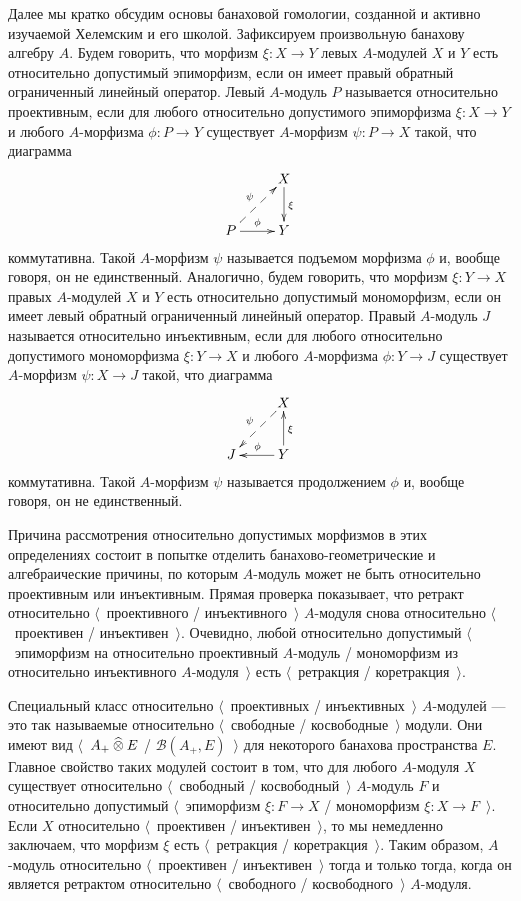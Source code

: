 Далее мы кратко обсудим основы банаховой гомологии, созданной и активно изучаемой Хелемским и его школой. Зафиксируем произвольную банахову алгебру $A$. Будем говорить, что морфизм $\xi:X\to Y$ левых $A$-модулей $X$ и $Y$ есть относительно допустимый эпиморфизм, если он имеет правый обратный ограниченный линейный оператор. Левый $A$-модуль $P$ называется относительно проективным, если для любого относительно допустимого эпиморфизма $\xi:X\to Y$ и любого $A$-морфизма $\phi:P\to Y$ существует $A$-морфизм $\psi:P\to X$ такой, что диаграмма
$$
\xymatrix{
& {X} \ar[d]^{\xi}\\
{P} \ar@{-->}[ur]^{\psi} \ar[r]^{\phi} &{Y}}
$$
коммутативна. Такой $A$-морфизм $\psi$ называется подъемом морфизма $\phi$ и, вообще говоря, он не единственный. Аналогично, будем говорить, что морфизм $\xi:Y\to X$ правых $A$-модулей $X$ и $Y$ есть относительно допустимый мономорфизм, если он имеет левый обратный ограниченный линейный оператор. Правый $A$-модуль $J$ называется относительно инъективным, если для любого относительно допустимого мономорфизма $\xi:Y\to X$ и любого $A$-морфизма $\phi:Y\to J$ существует $A$-морфизм $\psi:X\to J$ такой, что диаграмма
$$
\xymatrix{
& {X} \ar@{-->}[dl]_{\psi} \\
{J} &{Y} \ar[l]_{\phi} \ar[u]_{\xi}}
$$
коммутативна. Такой $A$-морфизм $\psi$ называется продолжением $\phi$ и, вообще говоря, он не единственный.

Причина рассмотрения относительно допустимых морфизмов в этих определениях состоит в попытке отделить банахово-геометрические и алгебраические причины, по которым $A$-модуль может не быть относительно проективным или инъективным. Прямая проверка показывает, что ретракт относительно $\langle$~проективного / инъективного~$\rangle$ $A$-модуля снова относительно $\langle$~проективен / инъективен~$\rangle$. Очевидно, любой относительно допустимый $\langle$~эпиморфизм на относительно проективный $A$-модуль / мономорфизм из относительно инъективного $A$-модуля~$\rangle$ есть $\langle$~ретракция / коретракция~$\rangle$.

Специальный класс относительно $\langle$~проективных / инъективных~$\rangle$ $A$-модулей --- это так называемые относительно $\langle$~свободные / косвободные~$\rangle$ модули. Они имеют вид $\langle$~$A_+\mathbin{\widehat{\otimes}} E$ / $\mathcal{B}(A_+,E)$~$\rangle$ для некоторого банахова пространства $E$. Главное свойство таких модулей состоит в том, что для любого $A$-модуля $X$ существует относительно $\langle$~свободный / косвободный~$\rangle$ $A$-модуль $F$ и относительно допустимый $\langle$~эпиморфизм $\xi:F\to X$ / мономорфизм $\xi:X\to F$~$\rangle$. Если $X$ относительно $\langle$~проективен / инъективен~$\rangle$, то мы немедленно заключаем, что морфизм $\xi$ есть $\langle$~ретракция / коретракция~$\rangle$. Таким образом, $A$-модуль относительно $\langle$~проективен / инъективен~$\rangle$ тогда и только тогда, когда он является ретрактом относительно $\langle$~свободного / косвободного~$\rangle$ $A$-модуля. 

